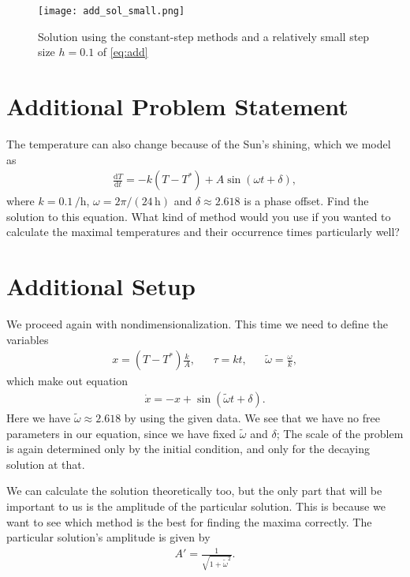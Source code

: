\documentclass[10pt,a4paper,twocolumn]{article}
\newcommand{\si}[2]{$#1 \, \mathrm{#2}$}
\begin{document}
\begin{figure}
    \centering
    \captionsetup{justification=centering}
    \texttt{[image: add\_sol\_small.png]}
    \caption{Solution using the constant-step methods and a relatively small step size $h=0.1$ of \cref{eq:add}}
    \label{fig:add_sol_small}
\end{figure}

\section{Additional Problem Statement}

The temperature can also change because of the Sun's shining, which we model as
%
\begin{align}
    \frac{\mathrm{d}T}{\mathrm{d}t} = - k (T - T^*) + A \sin (\omega t + \delta),
\end{align}
%
where $k=$\si{0.1}{/h}, $\omega = 2 \pi / (\text{\si{24}{h}})$ and $\delta \approx 2.618$ is a phase offset. Find the solution to this equation. What kind of method would you use if you wanted to calculate the maximal temperatures and their occurrence times particularly well?


\section{Additional Setup}

We proceed again with nondimensionalization. This time we need to define the variables
%
\begin{align}
    x = (T - T^*) \frac{k}{A},& &\tau = k t,& &\tilde{\omega} = \frac{\omega}{k},
\end{align}
which make out equation
%
\begin{align}\label{eq:add}
    \dot{x} = - x + \sin(\tilde{\omega} t + \delta).
\end{align}
%
Here we have $\tilde{\omega} \approx 2.618$ by using the given data. We see that we have no free parameters in our equation, since we have fixed $\tilde{\omega}$ and $\delta$; The scale of the problem is again determined only by the initial condition, and only for the decaying solution at that.

We can calculate the solution theoretically too, but the only part that will be important to us is the amplitude of the particular solution. This is because we want to see which method is the best for finding the maxima correctly. The particular solution's amplitude is given by
%
\begin{align}
    A' = \frac{1}{\sqrt{1+\tilde{\omega}^2}}.
\end{align}
\end{document}
